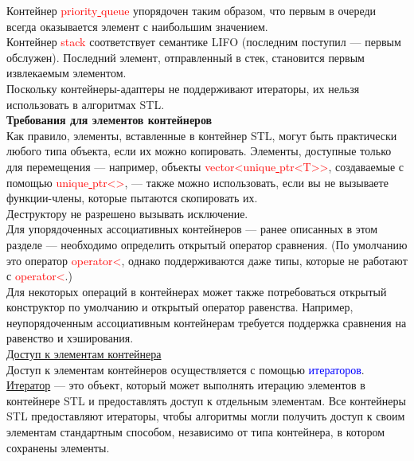 \documentclass[a4paper,10pt]{article}
\begin{document}
Контейнер \textcolor{red}{priority\underline{ }queue} упорядочен таким образом, что первым в очереди всегда оказывается элемент с наибольшим значением.
\\

Контейнер \textcolor{red}{stack} соответствует семантике LIFO (последним поступил — первым обслужен). Последний элемент, отправленный в стек, становится первым извлекаемым элементом.
\\

Поскольку контейнеры-адаптеры не поддерживают итераторы, их нельзя использовать в алгоритмах STL.
\\

\textbf{Требования для элементов контейнеров}
\\

Как правило, элементы, вставленные в контейнер STL, могут быть практически любого типа объекта, если их можно копировать. Элементы, доступные только для перемещения — например, объекты \textcolor{red}{vector<unique\underline{ }ptr<T>>}, создаваемые с помощью \textcolor{red}{unique\underline{ }ptr<>}, — также можно использовать, если вы не вызываете функции-члены, которые пытаются скопировать их.
\\

Деструктору не разрешено вызывать исключение.
\\

Для упорядоченных ассоциативных контейнеров — ранее описанных в этом разделе — необходимо определить открытый оператор сравнения. (По умолчанию это оператор \textcolor{red}{operator<}, однако поддерживаются даже типы, которые не работают с \textcolor{red}{operator<}.)
\\

Для некоторых операций в контейнерах может также потребоваться открытый конструктор по умолчанию и открытый оператор равенства. Например, неупорядоченным ассоциативным контейнерам требуется поддержка сравнения на равенство и хэширования.
\\

\underline{Доступ к элементам контейнера}
\\

Доступ к элементам контейнеров осуществляется с помощью \textcolor{blue}{итераторов}.
\\

\underline{Итератор} — это объект, который может выполнять итерацию элементов в контейнере STL и предоставлять доступ к отдельным элементам. Все контейнеры STL предоставляют итераторы, чтобы алгоритмы могли получить доступ к своим элементам стандартным способом, независимо от типа контейнера, в котором сохранены элементы.\\
\end{document}

